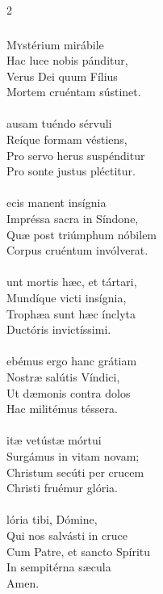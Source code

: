 \documentclass[9pt,twoside]{extarticle}
\begin{document}
\begin{multicols}{2}
\subsubsection*{\center {}}
\lettrine{M}ystérium mirábile\\
Hac luce nobis pánditur,\\
Verus Dei quum Fílius\\
Mortem cruéntam sústinet.\\
\\
ausam tuéndo sérvuli\\
Reíque formam véstiens,\\
Pro servo herus suspénditur\\
Pro sonte justus pléctitur.\\
\\
ecis manent insígnia\\
Impréssa sacra in Síndone,\\
Quæ post triúmphum nóbilem\\
Corpus cruéntum invólverat.\\
\\
unt mortis hæc, et tártari,\\
Mundíque victi insígnia,\\
Trophæa sunt hæc ínclyta\\
Ductóris invictíssimi.\\
\\
ebémus ergo hanc grátiam\\
Nostræ salútis Víndici,\\
Ut dæmonis contra dolos\\
Hac militémus téssera.\\
\\
itæ vetústæ mórtui\\
Surgámus in vitam novam;\\
Christum secúti per crucem\\
Christi fruémur glória.\\
\\
lória tibi, Dómine,\\
Qui nos salvásti in cruce\\
Cum Patre, et sancto Spíritu\\
In sempitérna sæcula\\
Amen.


\end{multicols}
\end{document}
